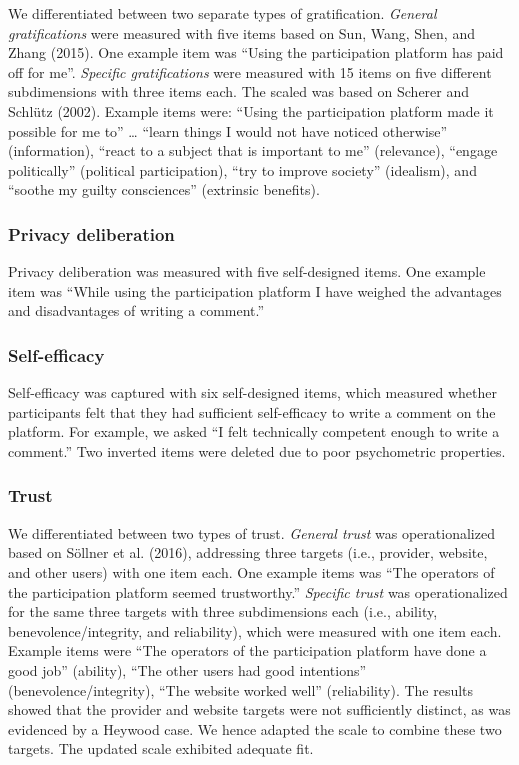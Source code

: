 \documentclass[
  english,
  man,floatsintext]{apa6}
\begin{document}
We differentiated between two separate types of gratification.
\emph{General gratifications} were measured with five items based on Sun, Wang, Shen, and Zhang (2015).
One example item was \enquote{Using the participation platform has paid off for me}.
\emph{Specific gratifications} were measured with 15 items on five different subdimensions with three items each.
The scaled was based on Scherer and Schlütz (2002).
Example items were: \enquote{Using the participation platform made it possible for me to} \ldots{} \enquote{learn things I would not have noticed otherwise} (information), \enquote{react to a subject that is important to me} (relevance), \enquote{engage politically} (political participation), \enquote{try to improve society} (idealism), and \enquote{soothe my guilty consciences} (extrinsic benefits).

\hypertarget{privacy-deliberation}{%
\subsubsection{Privacy deliberation}\label{privacy-deliberation}}

Privacy deliberation was measured with five self-designed items. One example item was \enquote{While using the participation platform I have weighed the advantages and disadvantages of writing a comment.}

\hypertarget{self-efficacy}{%
\subsubsection{Self-efficacy}\label{self-efficacy}}

Self-efficacy was captured with six self-designed items, which measured whether participants felt that they had sufficient self-efficacy to write a comment on the platform.
For example, we asked \enquote{I felt technically competent enough to write a comment.}
Two inverted items were deleted due to poor psychometric properties.

\hypertarget{trust}{%
\subsubsection{Trust}\label{trust}}

We differentiated between two types of trust.
\emph{General trust} was operationalized based on Söllner et al. (2016), addressing three targets (i.e., provider, website, and other users) with one item each.
One example items was \enquote{The operators of the participation platform seemed trustworthy.}
\emph{Specific trust} was operationalized for the same three targets with three subdimensions each (i.e., ability, benevolence/integrity, and reliability), which were measured with one item each.
Example items were \enquote{The operators of the participation platform have done a good job} (ability), \enquote{The other users had good intentions} (benevolence/integrity), \enquote{The website worked well} (reliability).
The results showed that the provider and website targets were not sufficiently distinct, as was evidenced by a Heywood case.
We hence adapted the scale to combine these two targets.
The updated scale exhibited adequate fit.
\end{document}
